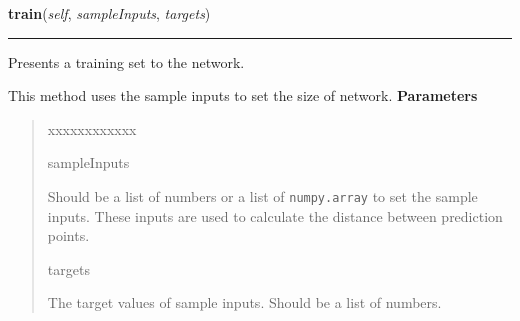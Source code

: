 \hspace{.8\funcindent}\begin{boxedminipage}{\funcwidth}

    \raggedright \textbf{train}(\textit{self}, \textit{sampleInputs}, \textit{targets})

    \vspace{-1.5ex}

    \rule{\textwidth}{0.5\fboxrule}
\setlength{\parskip}{2ex}

Presents a training set to the network.

This method uses the sample inputs to set the size of network.
\setlength{\parskip}{1ex}
      \textbf{Parameters}
      \vspace{-1ex}

      \begin{quote}
        \begin{Ventry}{xxxxxxxxxxxx}

          \item[sampleInputs]


Should be a list of numbers or a list of \texttt{numpy.array} to set the
sample inputs. These inputs are used to calculate the distance
between prediction points.
          \item[targets]


The target values of sample inputs. Should be a list of numbers.
        \end{Ventry}

      \end{quote}

    \end{boxedminipage}

    \label{peach:nn:nnet:GRNN:__call__}

    \vspace{0.5ex}

